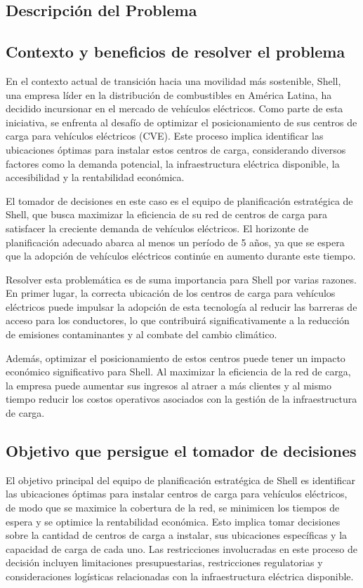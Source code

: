 \documentclass[letterpaper]{article}
\begin{document}
	\newpage
	\begin{flushleft}
		
		\section{Descripción del Problema}
		\subsection{Contexto y beneficios de resolver el problema}
		En el contexto actual de transición hacia una movilidad más sostenible, Shell, una empresa líder en la distribución de combustibles en América Latina, ha decidido incursionar en el mercado de vehículos eléctricos. Como parte de esta iniciativa, se enfrenta al desafío de optimizar el posicionamiento de sus centros de carga para vehículos eléctricos (CVE). Este proceso implica identificar las ubicaciones óptimas para instalar estos centros de carga, considerando diversos factores como la demanda potencial, la infraestructura eléctrica disponible, la accesibilidad y la rentabilidad económica. 
		
		El tomador de decisiones en este caso es el equipo de planificación estratégica de Shell, que busca maximizar la eficiencia de su red de centros de carga para satisfacer la creciente demanda de vehículos eléctricos. El horizonte de planificación adecuado abarca al menos un período de 5 años, ya que se espera que la adopción de vehículos eléctricos continúe en aumento durante este tiempo. 
		
		Resolver esta problemática es de suma importancia para Shell por varias razones. En primer lugar, la correcta ubicación de los centros de carga para vehículos eléctricos puede impulsar la adopción de esta tecnología al reducir las barreras de acceso para los conductores, lo que contribuirá significativamente a la reducción de emisiones contaminantes y al combate del cambio climático. 
		
		Además, optimizar el posicionamiento de estos centros puede tener un impacto económico significativo para Shell. Al maximizar la eficiencia de la red de carga, la empresa puede aumentar sus ingresos al atraer a más clientes y al mismo tiempo reducir los costos operativos asociados con la gestión de la infraestructura de carga. 
		
		\subsection{Objetivo que persigue el tomador de decisiones}
		El objetivo principal del equipo de planificación estratégica de Shell es identificar las ubicaciones óptimas para instalar centros de carga para vehículos eléctricos, de modo que se maximice la cobertura de la red, se minimicen los tiempos de espera y se optimice la rentabilidad económica. Esto implica tomar decisiones sobre la cantidad de centros de carga a instalar, sus ubicaciones específicas y la capacidad de carga de cada uno. Las restricciones involucradas en este proceso de decisión incluyen limitaciones presupuestarias, restricciones regulatorias y consideraciones logísticas relacionadas con la infraestructura eléctrica disponible. 
		

\end{flushleft}
\end{document}
